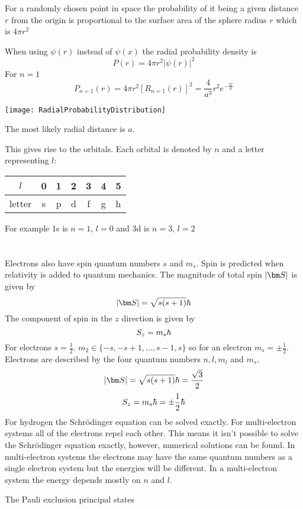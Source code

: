 For a randomly chosen point in space the probability of it being a given distance \(r\) from the origin is proportional to the surface area of the sphere radius \(r\) which is \(4\pi r^2\)

When using \(\psi(r)\) instead of \(\psi(x)\) the radial probability density is
\[P(r)=4\pi r^2|\psi(r)|^2\]
For \(n=1\)
\[P_{n=1}(r)=4\pi r^2[R_{n=1}(r)]^2=\frac{4}{a^3}r^2e^{-\frac{2r}{a}}\]

\begin{center}
\texttt{[image: RadialProbabilityDistribution]}
\end{center}
The most likely radial distance is \(a\).

This gives rise to the orbitals. Each orbital is denoted by \(n\) and a letter representing \(l\):

\begin{center}
\begin{tabular}{|c|cccccc|}\hline
\(l\) & 0 & 1 & 2 & 3 & 4 & 5\\\hline
letter& s & p & d & f & g & h\\\hline
\end{tabular}
\end{center}
For example 1s is \(n=1,\,l=0\) and 3d is \(n=3,\,l=2\)


\section{}

Electrons also have spin quantum numbers \(s\) and \(m_s\). Spin is predicted when relativity is added to quantum mechanics. The magnitude of total spin \(|\vv S|\) is given by
\[|\vv S|=\sqrt{s(s+1)}\hb\]
The component of spin in the \(z\) direction is given by
\[S_z=m_s\hbar\]
For electrons \(s=\frac12\). \(m_2\in\{-s,-s+1,\dots ,s-1,s\}\) so for an electron \(m_s=\pm\frac12\). Electrons are described by the four quantum numbers \(n,l,m_l\) and \(m_s\).
\[|\vv S|=\sqrt{s(s+1)}\hb=\frac{\sqrt{3}}{2}\]
\[S_z=m_s\hbar=\pm\frac12\hbar\]
For hydrogen the Schr\"odinger equation can be solved exactly. For multi-electron systems all of the electrons repel each other. This means it isn't possible to solve the Schr\"odinger equation exactly, however, numerical solutions can be found. In multi-electron systems the electrons may have the same quantum numbers as a single electron system but the energies will be different. In a multi-electron system the energy depends mostly on \(n\) and \(l\).

The Pauli exclusion principal states


